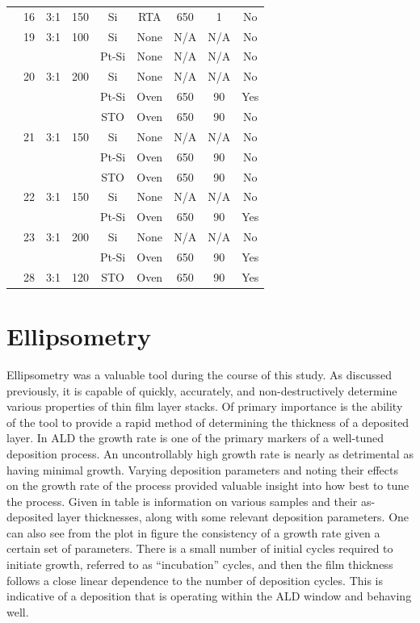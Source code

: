 {\begin{longtable}{ccccccccc}
		&16		&3:1		&150	&Si		&RTA	&650	&1		&No\\
		&19		&3:1		&100	&Si		&None 	&N/A		&N/A		&No\\
		&		&		&		&Pt-Si	&None 	&N/A		&N/A		&No\\
		&20		&3:1		&200	&Si		&None 	&N/A		&N/A		&No\\
		&		&		&		&Pt-Si	&Oven	&650	&90		&Yes\\
		&		&		&		&STO	&Oven	&650	&90		&No\\
		&21		&3:1		&150	&Si		&None 	&N/A		&N/A		&No\\
		&		&		&		&Pt-Si	&Oven	&650	&90		&No\\
		&		&		&		&STO	&Oven	&650	&90		&No\\
		&22		&3:1		&150	&Si		&None 	&N/A		&N/A		&No\\
		&		&		&		&Pt-Si	&Oven	&650	&90		&Yes\\
		&23		&3:1		&200	&Si		&None 	&N/A		&N/A		&No\\
		&		&		&		&Pt-Si	&Oven	&650	&90		&Yes\\
		&28		&3:1		&120	&STO	&Oven	&650	&90		&Yes\\
	\bottomrule
\end{longtable}}


\section{Ellipsometry}
\label{chap:Results-Ellipsometry}

Ellipsometry was a valuable tool during the course of this study. As discussed previously, it is capable of quickly, accurately, and non-destructively determine various properties of thin film layer stacks. Of primary importance is the ability of the tool to provide a rapid method of determining the thickness of a deposited layer. In ALD the growth rate is one of the primary markers of a well-tuned deposition process. An uncontrollably high growth rate is nearly as detrimental as having minimal growth. Varying deposition parameters and noting their effects on the growth rate of the process provided valuable insight into how best to tune the process.  Given in table  is information on various samples and their as-deposited layer thicknesses, along with some relevant deposition parameters. One can also see from the plot in figure  the consistency of a growth rate given a certain set of parameters. There is a small number of initial cycles required to initiate growth, referred to as ``incubation'' cycles, and then the film thickness follows a close linear dependence to the number of deposition cycles. This is indicative of a deposition that is operating within the ALD window and behaving well. 

